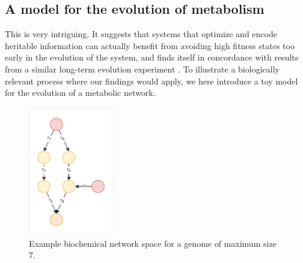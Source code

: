 \documentclass[paper=a4, fontsize=11pt,twoside]{scrartcl}       %
\begin{document}
\subsection*{A model for the evolution of metabolism}

This is very intriguing. It suggests that systems that optimize and encode heritable information can actually benefit from avoiding high fitness states too early in the evolution of the system, and finds itself in concordance with results from a similar long-term evolution experiment \cite{woodsSecondOrderSelectionEvolvability2011}. To illustrate a biologically relevant process where our findings would apply, we here introduce a toy model for the evolution of a metabolic network. 

\begin{figure}[h!]
	\centering
	\includegraphics[width = 0.33\textwidth]{figures/evolving_metabolism.pdf}
	\caption{Example biochemical network space for a genome of maximum size 7.}
	\label{evomet}
\end{figure}
\end{document}
